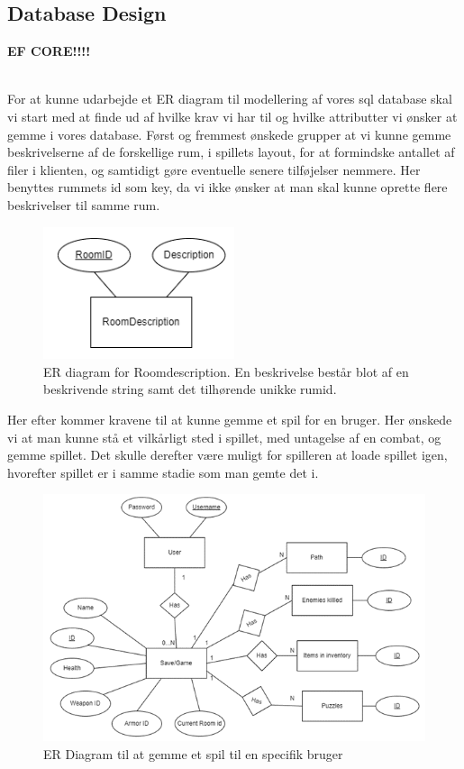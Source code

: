 \subsection{Database Design}

\textbf{EF CORE!!!!\\\\}

For at kunne udarbejde et ER diagram til modellering af vores sql database skal vi start med at finde ud af hvilke krav vi har til og hvilke attributter vi ønsker at gemme i vores database.
Først og fremmest ønskede grupper at vi kunne gemme beskrivelserne af de forskellige rum, i spillets layout, for at formindske antallet af filer i klienten, og samtidigt gøre eventuelle senere tilføjelser nemmere. Her benyttes rummets id som key, da vi ikke ønsker at man skal kunne oprette flere beskrivelser til samme rum.

\begin{figure}[H]
\centering
\includegraphics[width = 0.5\textwidth]{02-Body/Images/ER-RoomDescription.PNG}
\caption{ER diagram for Roomdescription. En beskrivelse består blot af en beskrivende string samt det tilhørende unikke rumid.}
\label{fig:ER-Roomdescription}
\end{figure}

Her efter kommer kravene til at kunne gemme et spil for en bruger. Her ønskede vi at man kunne stå et vilkårligt sted i spillet, med untagelse af en combat, og gemme spillet. Det skulle derefter være muligt for spilleren at loade spillet igen, hvorefter spillet er i samme stadie som man gemte det i.

\begin{figure}[H]
\centering
\includegraphics[width = \textwidth]{02-Body/Images/ER-GameSave.PNG}
\caption{ER Diagram til at gemme et spil til en specifik bruger}
\label{fig:ER-GameSave}
\end{figure}

